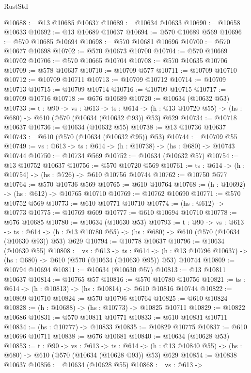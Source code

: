 \begin{lexlean}{RustStd}
\begin{coremodule}
@10688 := @13 @10685 @10637
@10689 := @10634 @10633
@10690 := @10658 @10633
@10692 := @13 @10689 @10637
@10694 := @570 @10689 @569
@10696 := @570 @10685 @10694
@10698 := @570 @10681 @10696
@10700 := @570 @10677 @10698
@10702 := @570 @10673 @10700
@10704 := @570 @10669 @10702
@10706 := @570 @10665 @10704
@10708 := @570 @10635 @10706
@10709 := @578 @10637
@10710 := @10709 @577
@10711 := @10709 @10710
@10712 := @10709 @10711
@10713 := @10709 @10712
@10714 := @10709 @10713
@10715 := @10709 @10714
@10716 := @10709 @10715
@10717 := @10709 @10716
@10718 := @676 @10689
@10720 := @10634 (@10632 @53)
@10733 := {t : @90} ->
  {vs : @613} ->
  {ts : @614} -> (h : @13 @10720 @55) -> (hs : @680) -> @610 (@570 (@10634 (@10632 @93)) @53) @629
@10734 := @10718 @10637
@10736 := @10634 (@10632 @55)
@10738 := @13 @10736 @10637
@10743 := @610 (@570 (@10634 (@10632 @95)) @53)
@10744 := @10709 @55
@10749 := {vs : @613} -> {ts : @614} -> (h : @10738) -> (hs : @680) -> @10743 @10744
@10750 := @10734 @569
@10752 := @10634 (@10632 @57)
@10754 := @13 @10752 @10637
@10756 := @570 @10720 @569
@10761 := {ts : @614} -> (h : @10754) -> (hs : @726) -> @610 @10756 @10744
@10762 := @10750 @577
@10764 := @570 @10736 @569
@10765 := @610 @10764
@10768 := (h : @10692) -> (hs : @612) -> @10765 @10710
@10769 := @10762 @10690
@10771 := @570 @10752 @569
@10773 := @610 @10771 @10710
@10774 := (hs : @612) -> @10773
@10775 := @10769 @609
@10777 := @610 @10694 @10710
@10778 := @676 @10685
@10780 := @10634 (@10630 @53)
@10793 := {t : @90} ->
  {vs : @613} ->
  {ts : @614} -> (h : @13 @10780 @55) -> (hs : @680) -> @610 (@570 (@10634 (@10630 @93)) @53) @629
@10794 := @10778 @10637
@10796 := @10634 (@10630 @55)
@10808 := {vs : @613} ->
  {ts : @614} ->
  (h : @13 @10796 @10637) -> (hs : @680) -> @610 (@570 (@10634 (@10630 @95)) @53) @10744
@10809 := @10794 @10694
@10811 := @10634 (@10630 @57)
@10813 := @13 @10811 @10637
@10814 := @10765 @57
@10816 := @570 @10780 @10756
@10821 := {ts : @614} -> (h : @10813) -> (hs : @10814) -> @610 @10816 @10744
@10822 := @10809 @10710
@10824 := @570 @10796 @10764
@10825 := @610 @10824
@10828 := (h : @10688) -> (hs : @10773) -> @10825 @10711
@10829 := @10822 @10686
@10831 := @570 @10811 @10771
@10833 := @610 @10831 @10711
@10834 := (hs : @10777) -> @10833
@10835 := @10829 @10775
@10837 := @610 @10696 @10711
@10838 := @676 @10681
@10840 := @10634 (@10628 @53)
@10853 := {t : @90} ->
  {vs : @613} ->
  {ts : @614} -> (h : @13 @10840 @55) -> (hs : @680) -> @610 (@570 (@10634 (@10628 @93)) @53) @629
@10854 := @10838 @10637
@10856 := @10634 (@10628 @55)
@10868 := {vs : @613} ->

\end{coremodule}
\end{lexlean}
